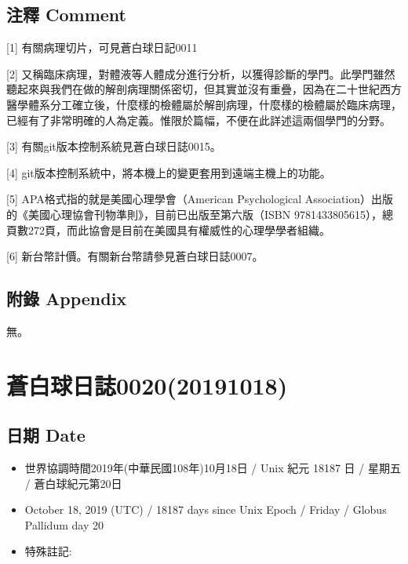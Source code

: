 \documentclass[a5paper, 12pt
]{book}
\providecommand{\tightlist}{%
  \setlength{\itemsep}{0pt}\setlength{\parskip}{0pt}}
\begin{document}
\hypertarget{ux6ce8ux91cb-comment-12}{%
\subsection{注釋 Comment}\label{ux6ce8ux91cb-comment-12}}

{[}1{]} 有關病理切片，可見蒼白球日記0011

{[}2{]}
又稱臨床病理，對體液等人體成分進行分析，以獲得診斷的學門。此學門雖然聽起來與我們在做的解剖病理關係密切，但其實並沒有重疊，因為在二十世紀西方醫學體系分工確立後，什麼樣的檢體屬於解剖病理，什麼樣的檢體屬於臨床病理，已經有了非常明確的人為定義。惟限於篇幅，不便在此詳述這兩個學門的分野。

{[}3{]} 有關git版本控制系統見蒼白球日誌0015。

{[}4{]} git版本控制系統中，將本機上的變更套用到遠端主機上的功能。

{[}5{]} APA格式指的就是美國心理學會（American Psychological
Association）出版的《美國心理協會刊物準則》，目前已出版至第六版（ISBN
9781433805615），總頁數272頁，而此協會是目前在美國具有權威性的心理學學者組織。

{[}6{]} 新台幣計價。有關新台幣請參見蒼白球日誌0007。

\hypertarget{ux9644ux9304-appendix-11}{%
\subsection{附錄 Appendix}\label{ux9644ux9304-appendix-11}}

無。

\hypertarget{ux84bcux767dux7403ux65e5ux8a8c002020191018}{%
\section{蒼白球日誌0020(20191018)}\label{ux84bcux767dux7403ux65e5ux8a8c002020191018}}

\hypertarget{ux65e5ux671f-date-17}{%
\subsection{日期 Date}\label{ux65e5ux671f-date-17}}

\begin{itemize}
\tightlist
\item
  世界協調時間2019年(中華民國108年)10月18日 / Unix 紀元 18187 日 /
  星期五 / 蒼白球紀元第20日
\item
  October 18, 2019 (UTC) / 18187 days since Unix Epoch / Friday / Globus
  Pallidum day 20
\item
  特殊註記:
\end{itemize}
\end{document}
